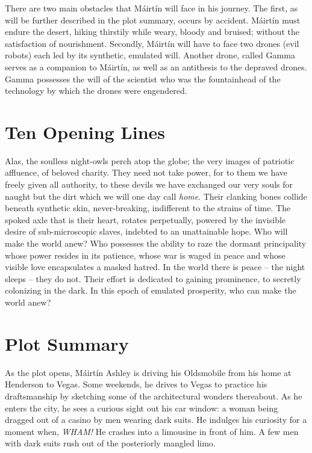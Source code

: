\documentclass[12pt]{article}
\newcommand{\mc}{M\'airt\'in}
\newcommand{\mcs}{M\'airt\'in }
\begin{document}
\begin{flushleft}
There are two main obstacles that \mcs will face in his journey. The first, as will be further described in the plot summary,
occurs by accident. \mcs must endure the desert, hiking thirstily while weary, bloody and bruised; without the satisfaction
of nourishment. Secondly, \mcs will have to face two drones (evil robots) each led by its synthetic, emulated
will. Another drone, called Gamma serves as a companion to \mc, as well as an antithesis to the depraved drones.
Gamma possesses the will of the scientist who was the fountainhead of the technology by which the drones were
engendered.

\section{Ten Opening Lines}

Alas, the soulless night-owls perch atop the globe; the very images of patriotic affluence, of beloved charity.
They need not take power, for to them we have freely given all authority, to these devils we have exchanged our very
souls for naught but the dirt which we will one day call \emph{home}.
Their clanking bones collide beneath synthetic skin, never-breaking, indifferent to the strains of time.
The spoked axle that is their heart, rotates perpetually, powered by the invisible desire of sub-microscopic slaves,
indebted to an unattainable hope. Who will make the world anew? Who possesses the ability to raze the dormant principality whose
power resides in its patience, whose war is waged in peace and whose visible love encapsulates a masked hatred.
In the world there is peace -- the night sleeps -- they do not. Their effort is dedicated to gaining prominence,
to secretly colonizing in the dark. In this epoch of emulated prosperity, who can make the world anew?

\section{Plot Summary}

As the plot opens, \mcs Ashley is driving his Oldsmobile from his home at Henderson
to Vegas. Some weekends, he drives to Vegas to practice his draftsmanship by sketching some of
the architectural wonders thereabout. As he enters the city, he sees a curious sight out his car window: 
a woman being dragged out of a casino by men wearing dark suits. He indulges 
his curiosity for a moment when, \emph{WHAM!} He crashes into a limousine in front of him.
A few men with dark suits rush out of the posteriorly mangled limo.


\end{flushleft}
\end{document}
